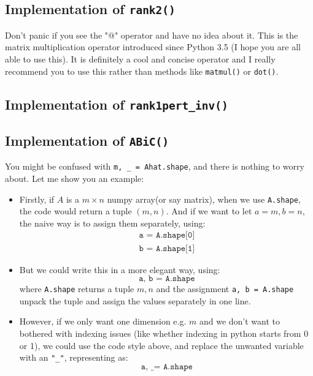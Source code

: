 \subsection{Implementation of \texttt{rank2()}}

Don't panic if you see the "@" operator and have no idea about it. This is the matrix multiplication operator introduced since Python 3.5 (I hope you are all able to use this). It is definitely a cool and concise operator and I really recommend you to use this rather than methods like \texttt{matmul()} or \texttt{dot()}.
\newpage
\subsection{Implementation of \texttt{rank1pert\_inv()}}

\subsection{Implementation of \texttt{ABiC()}}

You might be confused with \texttt{m, \_ = Ahat.shape}, and there is nothing to worry about. Let me show you an example:
\begin{itemize}
    \item Firstly, if \(A\) is a \(m \times  n\) numpy array(or say matrix), when we use \texttt{A.shape}, the code would return a tuple \((m, n)\). And if we want to let \(a = m, b = n\), the naive way is to assign them separately, using:
    \[
    \begin{array}{c}
        \texttt{a = A.shape[0]} \\
        \texttt{b = A.shape[1]}
    \end{array}
    \]
    \item But we could write this in a more elegant way, using:
    \[
        \texttt{a, b = A.shape}
    \]
    where \texttt{A.shape} returns a tuple \(m, n\) and the assignment \texttt{a, b = A.shape} unpack the tuple and assign the values separately in one line.
    \item However, if we only want one dimension e.g. \(m\) and we don't want to bothered with indexing issues (like whether indexing in python starts from 0 or 1), we could use the code style above, and replace the unwanted variable with an \texttt{"\_"}, representing as:
    \[
        \texttt{a, \_ = A.shape}
    \]
\end{itemize}

